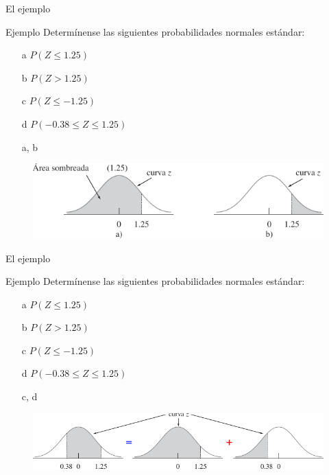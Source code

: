 \documentclass[11pt]{beamer}
\begin{document}
      \begin{frame}{El ejemplo}
          \begin{block}{Ejemplo}
              Determínense las siguientes probabilidades normales estándar:
              \begin{itemize}
                  \item[a] $P(Z \leq 1.25)$
                  \item[b] $P(Z >
1.25)$
                  \item[c] $P(Z \leq -1.25)$
                  \item[d] $P(-0.38 \leq Z \leq 1.25)$
              \end{itemize}
          \end{block}
          \begin{itemize}
              \item[a, b]
          \end{itemize}
          \begin{figure}
              \centering
              \includegraphics[width=1\linewidth]{images/estadistica12}
              \label{fig:estadistica12}
          \end{figure}

      \end{frame}
      \begin{frame}{El ejemplo}
          \begin{block}{Ejemplo}
              Determínense las siguientes probabilidades normales estándar:
              \begin{itemize}
                  \item[a] $P(Z \leq 1.25)$
                  \item[b] $P(Z >
1.25)$
                  \item[c] $P(Z \leq -1.25)$
                  \item[d] $P(-0.38 \leq Z \leq 1.25)$
              \end{itemize}
          \end{block}
          \begin{itemize}
              \item[c, d]
          \end{itemize}
          \begin{figure}
              \centering
              \includegraphics[width=1\linewidth]{images/estadistica13}
              \label{fig:estadistica12}
          \end{figure}

      \end{frame}
\end{document}
